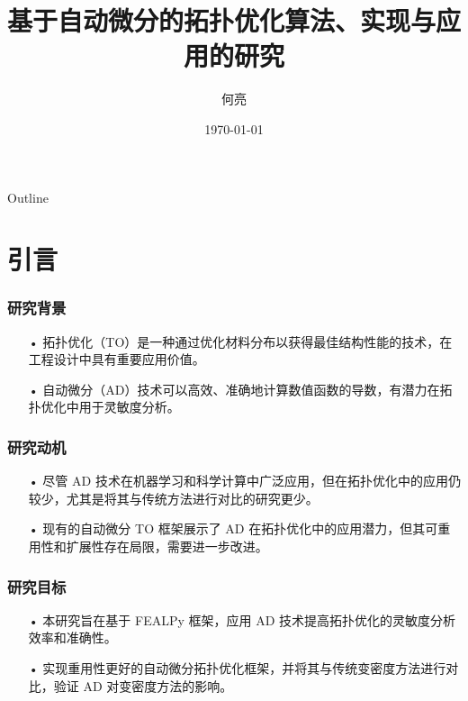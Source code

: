 \documentclass{beamer}
\title{基于自动微分的拓扑优化算法、实现与应用的研究}
\author{何亮}
\institute[XTU]{
学号：202331510117\\
\vspace{5pt}
湘潭大学$\bullet$数学与计算科学学院\\
}
\date[XTU]
{
    \today
}
\numberwithin{subsection}{section}
\begin{document}
\begin{frame}
  \titlepage
\end{frame}

\begin{frame}{Outline}
  \tableofcontents
\end{frame}

\section{引言}

\begin{frame}
\frametitle{研究背景}
    \begin{itemize}
	    \item[•]拓扑优化（TO）是一种通过优化材料分布以获得最佳结构性能的技术，在工程设计中具有重要应用价值。
	    \vspace{0.3cm}
	    \item[•]自动微分（AD）技术可以高效、准确地计算数值函数的导数，有潜力在拓扑优化中用于灵敏度分析。
    \end{itemize}
\end{frame}

\begin{frame}
\frametitle{研究动机}
    \begin{itemize}
	    \item[•]尽管 AD 技术在机器学习和科学计算中广泛应用，但在拓扑优化中的应用仍较少，尤其是将其与传统方法进行对比的研究更少。
	    \vspace{0.3cm}
	    \item[•]现有的自动微分 TO 框架展示了 AD 在拓扑优化中的应用潜力，但其可重用性和扩展性存在局限，需要进一步改进。
    \end{itemize}
\end{frame}

\begin{frame}
\frametitle{研究目标}
    \begin{itemize}
	    \item[•]本研究旨在基于 FEALPy 框架，应用 AD 技术提高拓扑优化的灵敏度分析效率和准确性。
	    \vspace{0.3cm}
	    \item[•]实现重用性更好的自动微分拓扑优化框架，并将其与传统变密度方法进行对比，验证 AD 对变密度方法的影响。
    \end{itemize}
\end{frame}
\end{document}
